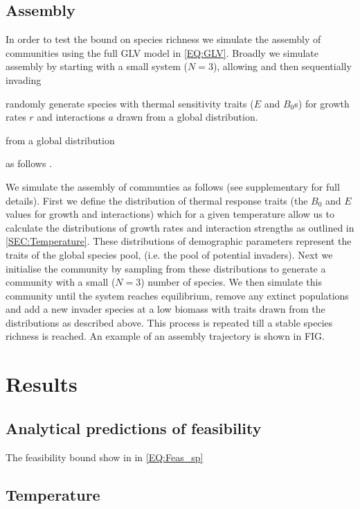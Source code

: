\documentclass{article}
\begin{document}
\subsection{Assembly}

In order to test the bound on species richness we simulate the assembly of communities using the full GLV model in \cref{EQ:GLV}. Broadly we simulate assembly by starting with a small system ($N = 3$), allowing  and then sequentially invading 

randomly generate species with thermal sensitivity traits ($E$ and $B_0$s) for growth rates $r$ and interactions $a$ drawn from a global distribution. 

from a global distribution 

as follows . 

We simulate the assembly of communties as follows (see supplementary for full details). First we define the distribution of thermal response traits (the $B_0$ and $E$ values for growth and interactions) which for a given temperature allow us to calculate the distributions of growth rates and interaction strengths as outlined in \cref{SEC:Temperature}. These distributions of demographic parameters represent the traits of the global species pool, (i.e. the pool of potential invaders). Next we initialise the community by sampling from these distributions to generate a community with a small ($N=3$) number of species. We then simulate this community until the system reaches equilibrium, remove any extinct populations and add a new invader species at a low biomass with traits drawn from the distributions as described above. This process is repeated till a stable species richness is reached. An example of an assembly trajectory is shown in FIG. 

\section{Results}
\subsection{Analytical predictions of feasibility}

The feasibility bound show in in \cref{EQ:Feas_sp} 



\subsection{Temperature}
\end{document}
